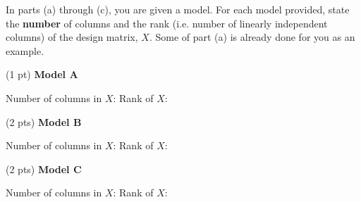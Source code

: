 \documentclass[twoside,12pt]{article}
\begin{document}
\begin{probset}
\begin{prob}[(8 pts)]
In parts (a) through (c), you are given a model. For each model provided, state the \textbf{number} of columns and the rank (i.e. number of linearly independent columns) of the design matrix, $X$. Some of part (a) is already done for you as an example.

\begin{subprobset}

\begin{subprob}(1 pt) \textbf{Model A}

Number of columns in $X$:  \hspace{0.3in} Rank of $X$: 

\end{subprob}

\begin{subprob}(2 pts) \textbf{Model B}

Number of columns in $X$:  \hspace{0.3in} Rank of $X$: 

\end{subprob}

\begin{subprob}(2 pts) \textbf{Model C}

Number of columns in $X$:  \hspace{0.3in} Rank of $X$: 

\end{subprob}










\end{subprobset}
\end{prob}
\end{probset}
\end{document}
